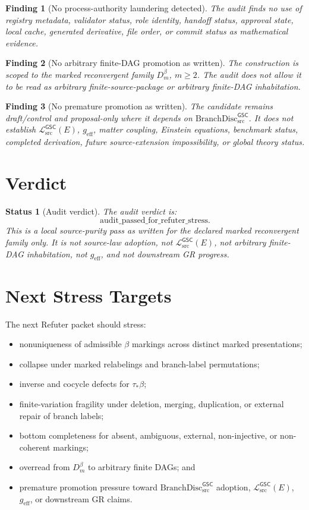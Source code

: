 \documentclass[11pt]{article}
\newcommand{\MetricData}{\mathcal{L}_{\mathrm{src}}^{\mathsf{GSC}}}
\newcommand{\geff}{g_{\mathrm{eff}}}
\newcommand{\BranchDisc}{\mathrm{BranchDisc}_{\mathrm{src}}^{\mathsf{GSC}}}
\newcommand{\Dmbeta}{D_m^{\beta}}
\newtheorem{finding}{Finding}
\newtheorem{status}{Status}
\begin{document}
\begin{finding}[No process-authority laundering detected]
The audit finds no use of registry metadata, validator status, role identity,
handoff status, approval state, local cache, generated derivative, file order,
or commit status as mathematical evidence.
\end{finding}

\begin{finding}[No arbitrary finite-DAG promotion as written]
The construction is scoped to the marked reconvergent family
\(\Dmbeta\), \(m\ge2\). The audit does not allow it to be read as arbitrary
finite-source-package or arbitrary finite-DAG inhabitation.
\end{finding}

\begin{finding}[No premature promotion as written]
The candidate remains draft/control and proposal-only where it depends on
\(\BranchDisc\). It does not establish \(\MetricData(E)\), \(\geff\), matter
coupling, Einstein equations, benchmark status, completed derivation, future
source-extension impossibility, or global theory status.
\end{finding}

\section{Verdict}

\begin{status}[Audit verdict]
The audit verdict is:
\[
  \mathrm{audit\_passed\_for\_refuter\_stress}.
\]
This is a local source-purity pass as written for the declared marked
reconvergent family only. It is not source-law adoption, not
\(\MetricData(E)\), not arbitrary finite-DAG inhabitation, not \(\geff\), and
not downstream GR progress.
\end{status}

\section{Next Stress Targets}

The next Refuter packet should stress:
\begin{itemize}[leftmargin=*]
  \item nonuniqueness of admissible \(\beta\) markings across distinct marked
  presentations;
  \item collapse under marked relabelings and branch-label permutations;
  \item inverse and cocycle defects for \(\tau_\ast\beta\);
  \item finite-variation fragility under deletion, merging, duplication, or
  external repair of branch labels;
  \item bottom completeness for absent, ambiguous, external, non-injective, or
  non-coherent markings;
  \item overread from \(\Dmbeta\) to arbitrary finite DAGs; and
  \item premature promotion pressure toward \(\BranchDisc\) adoption,
  \(\MetricData(E)\), \(\geff\), or downstream GR claims.
\end{itemize}
\end{document}
